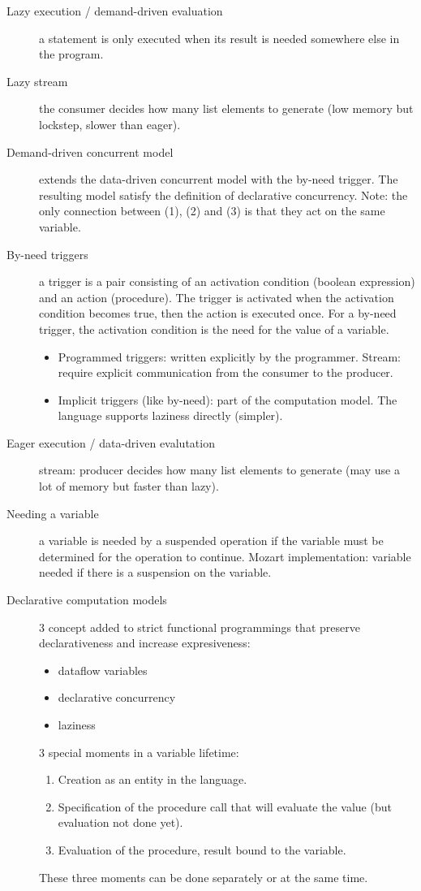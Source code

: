 \begin{description}
  \item[Lazy execution / demand-driven evaluation] a statement is only executed when its result is needed somewhere else in the program.
  \item[Lazy stream] the consumer decides how many list elements to generate (low memory but lockstep, slower than eager).
  \item[Demand-driven concurrent model] extends the data-driven concurrent model with the by-need trigger.
    The resulting model satisfy the definition of declarative concurrency.
    Note: the only connection between (1), (2) and (3) is that they act on the same variable.
  \item[By-need triggers] a trigger is a pair consisting of an activation condition (boolean expression) and an action (procedure).
    The trigger is activated when the activation condition becomes true, then the action is executed once.
    For a by-need trigger, the activation condition is the need for the value of a variable.
    \begin{itemize}
      \item Programmed triggers: written explicitly by the programmer.
        Stream: require explicit communication from the consumer to the producer.
      \item Implicit triggers (like by-need): part of the computation model.
        The language supports laziness directly (simpler).
    \end{itemize}

  \item[Eager execution / data-driven evalutation] stream: producer decides how many list elements to generate (may use a lot of memory but faster than lazy).

  \item[Needing a variable] a variable is needed by a suspended operation if the variable must be determined for the operation to continue.
    Mozart implementation: variable needed if there is a suspension on the variable.

  \item[Declarative computation models]
    3 concept added to strict functional programmings that preserve declarativeness and increase expresiveness:
    \begin{itemize}
      \item dataflow variables
      \item declarative concurrency
      \item laziness
    \end{itemize}
    3 special moments in a variable lifetime:
    \begin{enumerate}
      \item Creation as an entity in the language.
      \item Specification of the procedure call that will evaluate the value (but evaluation not done yet).
      \item Evaluation of the procedure, result bound to the variable.
    \end{enumerate}
    These three moments can be done separately or at the same time.
\end{description}


